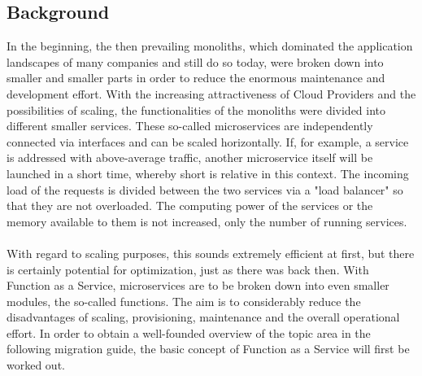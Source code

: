 \documentclass[a4paper,twoside,11pt, pagesize]{scrartcl}
\begin{document}
\begin{spacing}{1.2}
\section{Background}
In the beginning, the then prevailing monoliths, which dominated the application landscapes of many companies and still do so today, were broken down into smaller and smaller parts in order to reduce the enormous maintenance and development effort. With the increasing attractiveness of Cloud Providers and the possibilities of scaling, the functionalities of the monoliths were divided into different smaller services. These so-called microservices are independently connected via interfaces and can be scaled horizontally. If, for example, a service is addressed with above-average traffic, another microservice itself will be launched in a short time, whereby short is relative in this context. The incoming load of the requests is divided between the two services via a "load balancer" so that they are not overloaded. The computing power of the services or the memory available to them is not increased, only the number of running services. \\\\With regard to scaling purposes, this sounds extremely efficient at first, but there is certainly potential for optimization, just as there was back then. With Function as a Service, microservices are to be broken down into even smaller modules, the so-called functions. The aim is to considerably reduce the disadvantages of scaling, provisioning, maintenance and the overall operational effort. In order to obtain a well-founded overview of the topic area in the following migration guide, the basic concept of Function as a Service will first be worked out.

\end{spacing}
\end{document}
